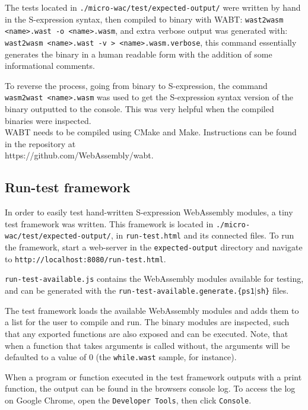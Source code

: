 \documentclass[a4paper]{article}
\begin{document}
The tests located in \texttt{./micro-wac/test/expected-output/} were written by hand in the S-expression syntax, then compiled to binary with WABT: \texttt{wast2wasm <name>.wast -o <name>.wasm}, and extra verbose output was generated with: \texttt{wast2wasm <name>.wast -v > <name>.wasm.verbose}, this command essentially generates the binary in a human readable form with the addition of some informational comments.

To reverse the process, going from binary to S-expression, the command \texttt{wasm2wast <name>.wasm} was used to get the S-expression syntax version of the binary outputted to the console. This was very helpful when the compiled binaries were inspected.\\

\noindent WABT needs to be compiled using CMake and Make. Instructions can be found in the repository at\\https://github.com/WebAssembly/wabt.

\subsection{Run-test framework}
\label{sec:peripherals:run-test-framework}
In order to easily test hand-written S-expression WebAssembly modules, a tiny test framework was written. This framework is located in \texttt{./micro-wac/test/expected-output/}, in \texttt{run-test.html} and its connected files. To run the framework, start a web-server in the \texttt{expected-output} directory and navigate to \texttt{http://localhost:8080/run-test.html}.

\texttt{run-test-available.js} contains the WebAssembly modules available for testing, and can be generated with the \texttt{run-test-available.generate.\{ps1$|$sh\}} files.

The test framework loads the available WebAssembly modules and adds them to a list for the user to compile and run. The binary modules are inspected, such that any exported functions are also exposed and can be executed. Note, that when a function that takes arguments is called without, the arguments will be defaulted to a value of 0 (the \texttt{while.wast} sample, for instance).

When a program or function executed in the test framework outputs with a print function, the output can be found in the browsers console log. To access the log on Google Chrome, open the \texttt{Developer Tools}, then click \texttt{Console}.
\end{document}
